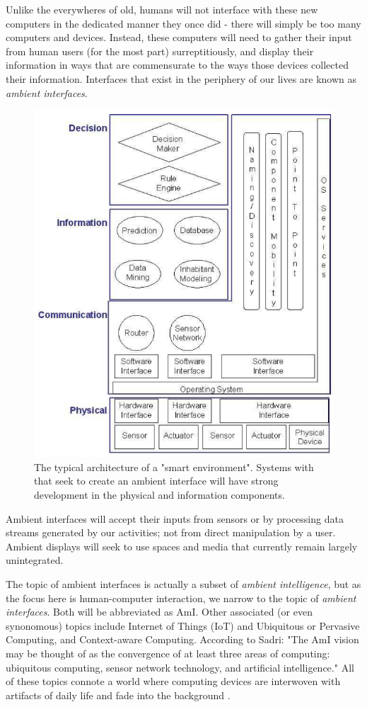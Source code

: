 \documentclass{article}
\begin{document}
Unlike the everywheres of old, humans will not interface with these new computers in the dedicated manner they once did - there will simply be too many computers and devices. Instead, these computers will need to gather their input from human users (for the most part) surreptitiously, and display their information in ways that are commensurate to the ways those devices collected their information. Interfaces that exist in the periphery of our lives are known as \emph{ambient interfaces}.
 \begin{figure}
  \begin{center}
    \includegraphics[width=.8\linewidth]{ami_arch}
  \end{center}
  \caption{The typical architecture of a "smart environment". Systems with that seek to create an ambient interface will have strong development in the physical and information components. \cite{Cook:2007:SOE:1225943.1226005}}
  \label{ami_arch}
\end{figure}

Ambient interfaces will accept their inputs from sensors or by processing data streams generated by our activities; not from direct manipulation by a user. Ambient displays will seek to use spaces and media that currently remain largely unintegrated.
 
The topic of ambient interfaces is actually a subset of \emph{ambient intelligence}, but as the focus here is human-computer interaction, we narrow to the topic of \emph{ambient interfaces}. Both will be abbreviated as AmI. Other associated (or even synonomous) topics include Internet of Things (IoT) and Ubiquitous or Pervasive Computing, and Context-aware Computing. According to Sadri: "The AmI vision may be thought of as the convergence of at least three areas of computing: ubiquitous computing, sensor network technology, and artificial intelligence." \cite{Sadri:2011:AIS:1978802.1978815} All of these topics connote a world where computing devices are interwoven with artifacts of daily life and fade into the background \cite{Cook2009277}.
\end{document}
